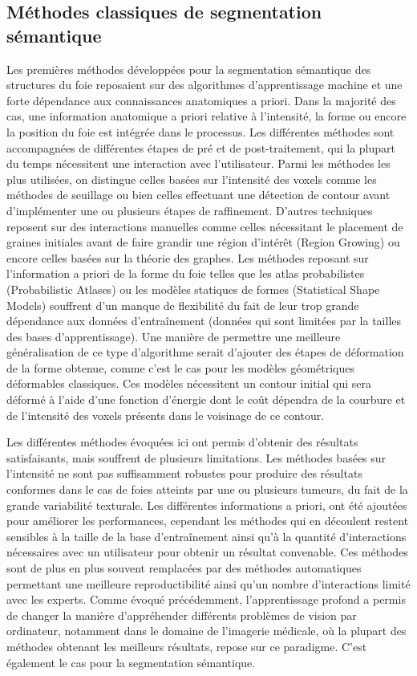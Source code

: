 \documentclass[]{memoir}
\begin{document}
\subsection{Méthodes classiques de segmentation sémantique}
Les premières méthodes développées pour la segmentation sémantique des structures du foie reposaient sur des algorithmes d’apprentissage machine et une forte dépendance aux connaissances anatomiques a priori.
Dans la majorité des cas, une information anatomique a priori relative à l’intensité, la forme ou encore la position du foie est intégrée dans le processus. Les différentes méthodes sont accompagnées de différentes étapes de pré et de post-traitement, qui la plupart du temps nécessitent une interaction avec l’utilisateur. 
Parmi les méthodes les plus utilisées, on distingue celles basées sur l’intensité des voxels comme les méthodes de seuillage ou bien celles effectuant une détection de contour avant d’implémenter une ou plusieurs étapes de raffinement. 
D’autres techniques reposent sur des interactions manuelles comme celles nécessitant le placement de graines initiales avant de faire grandir une région d’intérêt (Region Growing) ou encore celles basées sur la théorie des graphes.
Les méthodes reposant sur l’information a priori de la forme du foie telles que les atlas probabilistes (Probabilistic Atlases) ou les modèles statiques de formes (Statistical Shape Models) souffrent d’un manque de flexibilité du fait de leur trop grande dépendance aux données d’entraînement (données qui sont limitées par la tailles des bases d’apprentissage). 
Une manière de permettre une meilleure généralisation de ce type d’algorithme serait d’ajouter des étapes de déformation de la forme obtenue, comme c’est le cas pour les modèles géométriques déformables classiques. Ces modèles nécessitent un contour initial qui sera déformé à l’aide d’une fonction d’énergie dont le coût dépendra de la courbure et de l’intensité des voxels présents dans le voisinage de ce contour.

Les différentes méthodes évoquées ici ont permis d’obtenir des résultats satisfaisants, mais souffrent de plusieurs limitations. Les méthodes basées sur l’intensité ne sont pas suffisamment robustes pour produire des résultats conformes dans le cas de foies atteints par une ou plusieurs tumeurs, du fait de la grande variabilité texturale. Les différentes informations a priori, ont été ajoutées pour améliorer les performances, cependant les méthodes qui en découlent restent sensibles à la taille de la base d’entraînement ainsi qu’à la quantité d’interactions nécessaires avec un utilisateur pour obtenir un résultat convenable.
Ces méthodes sont de plus en plus souvent remplacées par des méthodes automatiques permettant une meilleure reproductibilité ainsi qu’un nombre d’interactions limité avec les experts.
Comme évoqué précédemment, l’apprentissage profond a permis de changer la manière d’appréhender différents problèmes de vision par ordinateur, notamment dans le domaine de l’imagerie médicale, où la plupart des méthodes obtenant les meilleurs résultats, repose sur ce paradigme. C’est également le cas pour la segmentation sémantique.
\end{document}
